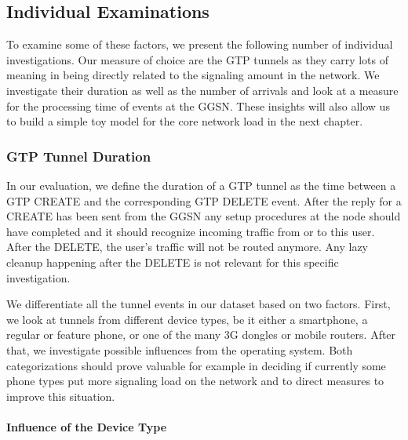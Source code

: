 \subsection{Individual Examinations}

To examine some of these factors, we present the following number of individual investigations. Our measure of choice are the GTP tunnels as they carry lots of meaning in being directly related to the signaling amount in the network. We investigate their duration as well as the number of arrivals and look at a measure for the processing time of events at the GGSN. These insights will also allow us to build a simple toy model for the core network load in the next chapter.


\subsubsection{GTP Tunnel Duration}

In our evaluation, we define the duration of a GTP tunnel as the time between a GTP CREATE and the corresponding GTP DELETE event. After the reply for a CREATE has been sent from the \ac{GGSN} any setup procedures at the node should have completed and it should recognize incoming traffic from or to this user. After the DELETE, the user's traffic will not be routed anymore. Any lazy cleanup happening after the DELETE is not relevant for this specific investigation.

We differentiate all the tunnel events in our dataset based on two factors. First, we look at tunnels from different device types, be it either a smartphone, a regular or feature phone, or one of the many 3G dongles or mobile routers. After that, we investigate possible influences from the operating system. Both categorizations should prove valuable for example in deciding if currently some phone types put more signaling load on the network and to direct measures to improve this situation.



\paragraph{Influence of the Device Type}

